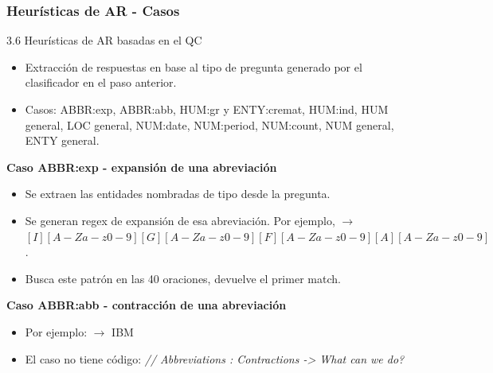 \begin{frame}
  \frametitle{Heurísticas de AR - Casos}
    \begin{block}{3.6 Heurísticas de AR basadas en el QC}
  \begin{itemize}
      \item Extracción de respuestas en base al tipo de pregunta generado por el clasificador en el paso anterior.
      \item Casos: ABBR:exp, ABBR:abb, HUM:gr y ENTY:cremat, HUM:ind, HUM general, LOC general, NUM:date, NUM:period, NUM:count, NUM general, ENTY general.\

    \end{itemize}
  \end{block}
\textbf{Caso ABBR:exp - expansión de una abreviación}\newline
  \begin{itemize}
    \item Se extraen las entidades nombradas de tipo  desde la pregunta. 
    \item Se generan regex de expansión de esa abreviación. Por ejemplo,  $\rightarrow$ $[I][A-Za-z0-9][G][A-Za-z0-9][F][A-Za-z0-9][A][A-Za-z0-9]$.
    \item Busca este patrón en las 40 oraciones, devuelve el primer match. \newline
  \end{itemize}
\textbf{Caso ABBR:abb - contracción de una abreviación}\newline
  \begin{itemize}
    \item  Por ejemplo:  $\rightarrow$ IBM
    \item  El caso no tiene código: \textit{// Abbreviations : Contractions -> What can we do?} \newline
  \end{itemize}


\end{frame}


